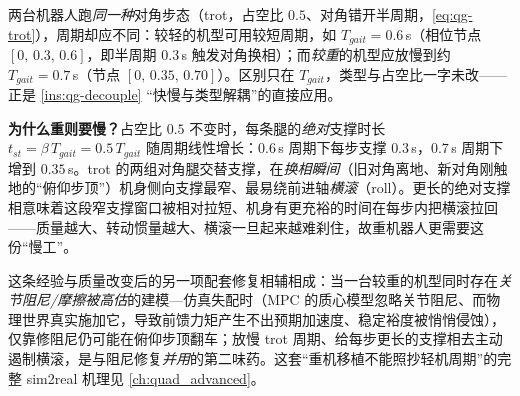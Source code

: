 \begin{insight}\label{ins:qg-heavy-trot}
两台机器人跑\emph{同一种}对角步态（trot，占空比 $0.5$、对角错开半周期，\cref{eq:qg-trot}），周期却应不同：较轻的机型可用较短周期，如 $T_{gait}=0.6\,$s（相位节点 $[0,\,0.3,\,0.6]$，即半周期 $0.3\,$s 触发对角换相）；而\emph{较重}的机型应放慢到约 $T_{gait}=0.7\,$s（节点 $[0,\,0.35,\,0.70]$）。区别只在 $T_{gait}$，类型与占空比一字未改——正是 \cref{ins:qg-decouple} “快慢与类型解耦”的直接应用。

\textbf{为什么重则要慢？}\;占空比 $0.5$ 不变时，每条腿的\emph{绝对}支撑时长 $t_{st}=\beta\,T_{gait}=0.5\,T_{gait}$ 随周期线性增长：$0.6\,$s 周期下每步支撑 $0.3\,$s，$0.7\,$s 周期下增到 $0.35\,$s。trot 的两组对角腿交替支撑，在\emph{换相瞬间}（旧对角离地、新对角刚触地的“俯仰步顶”）机身侧向支撑最窄、最易绕前进轴\emph{横滚}（roll）。更长的绝对支撑相意味着这段窄支撑窗口被相对拉短、机身有更充裕的时间在每步内把横滚拉回——质量越大、转动惯量越大、横滚一旦起来越难刹住，故重机器人更需要这份“慢工”。

这条经验与质量改变后的另一项配套修复相辅相成：当一台较重的机型同时存在\emph{关节阻尼/摩擦被高估}的建模—仿真失配时（MPC 的质心模型忽略关节阻尼、而物理世界真实施加它，导致前馈力矩产生不出预期加速度、稳定裕度被悄悄侵蚀），仅靠修阻尼仍可能在俯仰步顶翻车；放慢 trot 周期、给每步更长的支撑相去主动遏制横滚，是与阻尼修复\emph{并用}的第二味药。这套“重机移植不能照抄轻机周期”的完整 sim2real 机理见 \cref{ch:quad_advanced}。
\end{insight}

